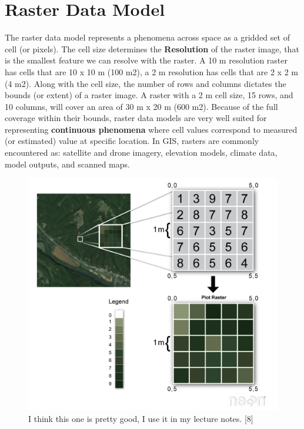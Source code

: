 \documentclass[
]{book}
\begin{document}
\hypertarget{raster-data-model}{%
\section{Raster Data Model}\label{raster-data-model}}

The raster data model represents a phenomena across space as a gridded set of cell (or pixels). The cell size determines the \textbf{Resolution} of the raster image, that is the smallest feature we can resolve with the raster. A 10 m resolution raster has cells that are 10 x 10 m (100 m2), a 2 m resolution has cells that are 2 x 2 m (4 m2). Along with the cell size, the number of rows and columns dictates the bounds (or extent) of a raster image. A raster with a 2 m cell size, 15 rows, and 10 columns, will cover an area of 30 m x 20 m (600 m2). Because of the full coverage within their bounds, raster data models are very well suited for representing \textbf{continuous phenomena} where cell values correspond to measured (or estimated) value at specific location. In GIS, rasters are commonly encountered as: satellite and drone imagery, elevation models, climate data, model outputs, and scanned maps.

\begin{figure}
\centering
\includegraphics{images/03-raster-example.png}
\caption{I think this one is pretty good, I use it in my lecture notes. {[}8{]}}
\end{figure}
\end{document}
